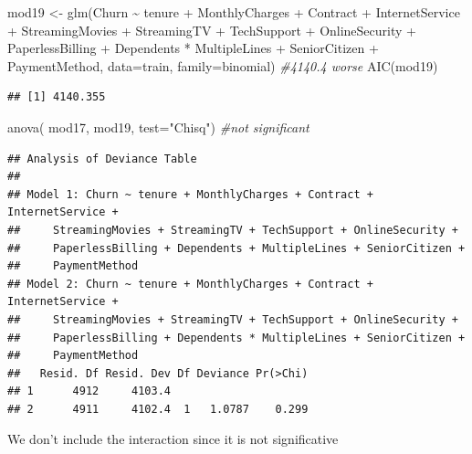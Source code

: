 \documentclass[
  twoside]{article}
\newenvironment{Shaded}{\begin{snugshade}}{\end{snugshade}}
\newcommand{\AttributeTok}[1]{\textcolor[rgb]{0.77,0.63,0.00}{#1}}
\newcommand{\CommentTok}[1]{\textcolor[rgb]{0.56,0.35,0.01}{\textit{#1}}}
\newcommand{\FunctionTok}[1]{\textcolor[rgb]{0.00,0.00,0.00}{#1}}
\newcommand{\NormalTok}[1]{#1}
\newcommand{\OtherTok}[1]{\textcolor[rgb]{0.56,0.35,0.01}{#1}}
\newcommand{\SpecialCharTok}[1]{\textcolor[rgb]{0.00,0.00,0.00}{#1}}
\newcommand{\StringTok}[1]{\textcolor[rgb]{0.31,0.60,0.02}{#1}}
\begin{document}
\begin{Shaded}
\begin{Highlighting}[]
\NormalTok{mod19 }\OtherTok{\textless{}{-}} \FunctionTok{glm}\NormalTok{(Churn }\SpecialCharTok{\textasciitilde{}}\NormalTok{ tenure }\SpecialCharTok{+}\NormalTok{ MonthlyCharges }\SpecialCharTok{+}\NormalTok{ Contract }\SpecialCharTok{+}\NormalTok{ InternetService }\SpecialCharTok{+} 
\NormalTok{               StreamingMovies }\SpecialCharTok{+}\NormalTok{ StreamingTV }\SpecialCharTok{+}\NormalTok{ TechSupport }\SpecialCharTok{+}\NormalTok{ OnlineSecurity }\SpecialCharTok{+}
\NormalTok{               PaperlessBilling }\SpecialCharTok{+}\NormalTok{ Dependents }\SpecialCharTok{*}\NormalTok{ MultipleLines }\SpecialCharTok{+}\NormalTok{ SeniorCitizen }\SpecialCharTok{+} 
\NormalTok{               PaymentMethod, }\AttributeTok{data=}\NormalTok{train, }\AttributeTok{family=}\NormalTok{binomial)}
 \CommentTok{\#4140.4 worse}
\FunctionTok{AIC}\NormalTok{(mod19)}
\end{Highlighting}
\end{Shaded}

\begin{verbatim}
## [1] 4140.355
\end{verbatim}

\begin{Shaded}
\begin{Highlighting}[]
\FunctionTok{anova}\NormalTok{( mod17, mod19,  }\AttributeTok{test=}\StringTok{"Chisq"}\NormalTok{) }\CommentTok{\#not significant}
\end{Highlighting}
\end{Shaded}

\begin{verbatim}
## Analysis of Deviance Table
## 
## Model 1: Churn ~ tenure + MonthlyCharges + Contract + InternetService + 
##     StreamingMovies + StreamingTV + TechSupport + OnlineSecurity + 
##     PaperlessBilling + Dependents + MultipleLines + SeniorCitizen + 
##     PaymentMethod
## Model 2: Churn ~ tenure + MonthlyCharges + Contract + InternetService + 
##     StreamingMovies + StreamingTV + TechSupport + OnlineSecurity + 
##     PaperlessBilling + Dependents * MultipleLines + SeniorCitizen + 
##     PaymentMethod
##   Resid. Df Resid. Dev Df Deviance Pr(>Chi)
## 1      4912     4103.4                     
## 2      4911     4102.4  1   1.0787    0.299
\end{verbatim}

We don't include the interaction since it is not significative
\end{document}
